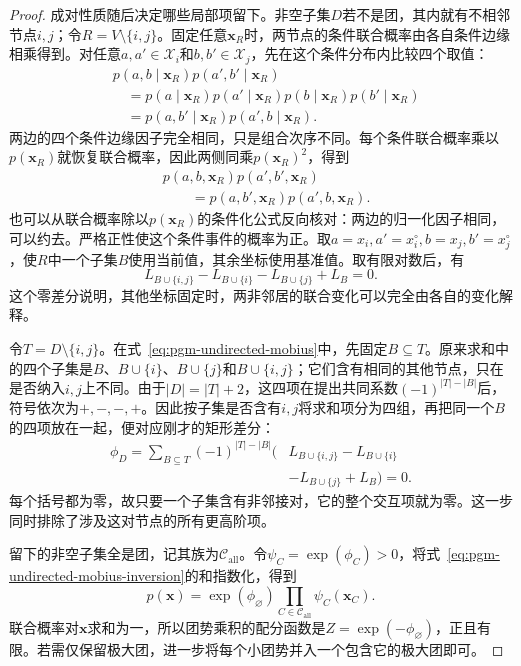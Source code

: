 \begin{proof}
成对性质随后决定哪些局部项留下。非空子集$D$若不是团，其内就有不相邻节点$i,j$；令$R=V\setminus\{i,j\}$。固定任意$\bm{x}_R$时，两节点的条件联合概率由各自条件边缘相乘得到。对任意$a,a'\in\mathcal{X}_i$和$b,b'\in\mathcal{X}_j$，先在这个条件分布内比较四个取值：
\[
  \begin{aligned}
    &p(a,b\mid\bm{x}_R)p(a',b'\mid\bm{x}_R)\\
    &\quad=p(a\mid\bm{x}_R)p(a'\mid\bm{x}_R)
            p(b\mid\bm{x}_R)p(b'\mid\bm{x}_R)\\
    &\quad=p(a,b'\mid\bm{x}_R)p(a',b\mid\bm{x}_R).
  \end{aligned}
\]
两边的四个条件边缘因子完全相同，只是组合次序不同。每个条件联合概率乘以$p(\bm{x}_R)$就恢复联合概率，因此两侧同乘$p(\bm{x}_R)^2$，得到
\begin{equation}
  \begin{aligned}
    &p(a,b,\bm{x}_R)p(a',b',\bm{x}_R)\\
    &\qquad=p(a,b',\bm{x}_R)p(a',b,\bm{x}_R).
  \end{aligned}
  \label{eq:pgm-undirected-rectangle}
\end{equation}
也可以从联合概率除以$p(\bm{x}_R)$的条件化公式反向核对：两边的归一化因子相同，可以约去。严格正性使这个条件事件的概率为正。取$a=x_i,a'=x_i^{\circ},b=x_j,b'=x_j^{\circ}$，使$R$中一个子集$B$使用当前值，其余坐标使用基准值。取有限对数后，有
\[
  L_{B\cup\{i,j\}}-L_{B\cup\{i\}}
  -L_{B\cup\{j\}}+L_B=0.
\]
这个零差分说明，其他坐标固定时，两非邻居的联合变化可以完全由各自的变化解释。

令$T=D\setminus\{i,j\}$。在式~\eqref{eq:pgm-undirected-mobius}中，先固定$B\subseteq T$。原来求和中的四个子集是$B$、$B\cup\{i\}$、$B\cup\{j\}$和$B\cup\{i,j\}$；它们含有相同的其他节点，只在是否纳入$i,j$上不同。由于$|D|=|T|+2$，这四项在提出共同系数$(-1)^{|T|-|B|}$后，符号依次为$+,-,-,+$。因此按子集是否含有$i,j$将求和项分为四组，再把同一个$B$的四项放在一起，便对应刚才的矩形差分：
\begin{equation}
  \begin{aligned}
    \phi_D
    =\sum_{B\subseteq T}(-1)^{|T|-|B|}
      \bigl(&L_{B\cup\{i,j\}}-L_{B\cup\{i\}}\\
            &-L_{B\cup\{j\}}+L_B\bigr)=0.
  \end{aligned}
  \label{eq:pgm-undirected-nonclique-vanishes}
\end{equation}
每个括号都为零，故只要一个子集含有非邻接对，它的整个交互项就为零。这一步同时排除了涉及这对节点的所有更高阶项。

留下的非空子集全是团，记其族为$\mathcal{C}_{\mathrm{all}}$。令$\psi_C=\exp(\phi_C)>0$，将式~\eqref{eq:pgm-undirected-mobius-inversion}的和指数化，得到
\[
  p(\bm{x})
  =\exp(\phi_{\varnothing})
     \prod_{C\in\mathcal{C}_{\mathrm{all}}}\psi_C(\bm{x}_C).
\]
联合概率对$\bm{x}$求和为一，所以团势乘积的配分函数是$Z=\exp(-\phi_{\varnothing})$，正且有限。若需仅保留极大团，进一步将每个小团势并入一个包含它的极大团即可。
\end{proof}

